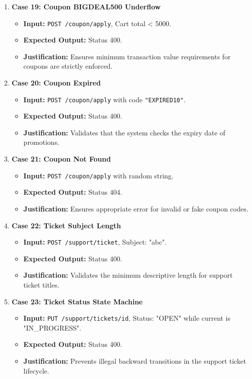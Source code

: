 \documentclass{article}
\begin{document}
\begin{enumerate}
    \item \textbf{Case 19: Coupon BIGDEAL500 Underflow}
    \begin{itemize}
        \item \textbf{Input:} \texttt{POST /coupon/apply}, Cart total < 5000.
        \item \textbf{Expected Output:} Status 400.
        \item \textbf{Justification:} Ensures minimum transaction value requirements for coupons are strictly enforced.
    \end{itemize}

    \item \textbf{Case 20: Coupon Expired}
    \begin{itemize}
        \item \textbf{Input:} \texttt{POST /coupon/apply} with code \texttt{"EXPIRED10"}.
        \item \textbf{Expected Output:} Status 400.
        \item \textbf{Justification:} Validates that the system checks the expiry date of promotions.
    \end{itemize}

    \item \textbf{Case 21: Coupon Not Found}
    \begin{itemize}
        \item \textbf{Input:} \texttt{POST /coupon/apply} with random string.
        \item \textbf{Expected Output:} Status 404.
        \item \textbf{Justification:} Ensures appropriate error for invalid or fake coupon codes.
    \end{itemize}

    \item \textbf{Case 22: Ticket Subject Length}
    \begin{itemize}
        \item \textbf{Input:} \texttt{POST /support/ticket}, Subject: "abc".
        \item \textbf{Expected Output:} Status 400.
        \item \textbf{Justification:} Validates the minimum descriptive length for support ticket titles.
    \end{itemize}

    \item \textbf{Case 23: Ticket Status State Machine}
    \begin{itemize}
        \item \textbf{Input:} \texttt{PUT /support/tickets/id}, Status: "OPEN" while current is "IN_PROGRESS".
        \item \textbf{Expected Output:} Status 400.
        \item \textbf{Justification:} Prevents illegal backward transitions in the support ticket lifecycle.
    \end{itemize}


\end{enumerate}
\end{document}
